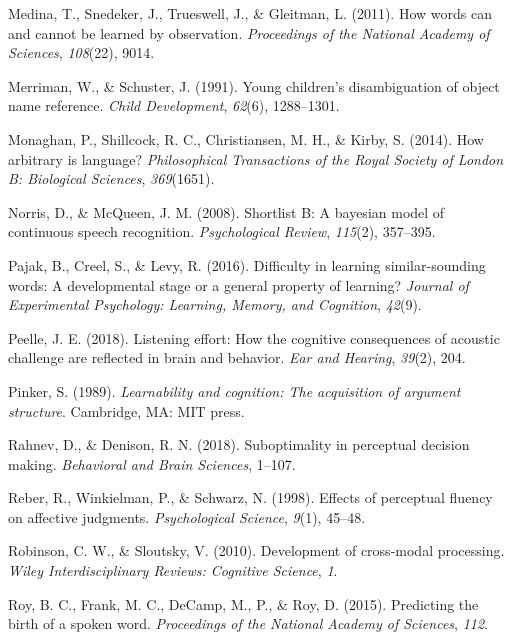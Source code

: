 \documentclass[english,floatsintext,man]{apa6}
\theoremstyle{definition}
\theoremstyle{definition}
\theoremstyle{definition}
\theoremstyle{remark}
\begin{document}
\hypertarget{ref-medina2011}{}
Medina, T., Snedeker, J., Trueswell, J., \& Gleitman, L. (2011). How
words can and cannot be learned by observation. \emph{Proceedings of the
National Academy of Sciences}, \emph{108}(22), 9014.

\hypertarget{ref-Merriman91}{}
Merriman, W., \& Schuster, J. (1991). Young children's disambiguation of
object name reference. \emph{Child Development}, \emph{62}(6),
1288--1301.

\hypertarget{ref-Monaghan2014}{}
Monaghan, P., Shillcock, R. C., Christiansen, M. H., \& Kirby, S.
(2014). How arbitrary is language? \emph{Philosophical Transactions of
the Royal Society of London B: Biological Sciences}, \emph{369}(1651).

\hypertarget{ref-Norris08}{}
Norris, D., \& McQueen, J. M. (2008). Shortlist B: A bayesian model of
continuous speech recognition. \emph{Psychological Review},
\emph{115}(2), 357--395.

\hypertarget{ref-pajak2016}{}
Pajak, B., Creel, S., \& Levy, R. (2016). Difficulty in learning
similar-sounding words: A developmental stage or a general property of
learning? \emph{Journal of Experimental Psychology: Learning, Memory,
and Cognition}, \emph{42}(9).

\hypertarget{ref-peelle2018}{}
Peelle, J. E. (2018). Listening effort: How the cognitive consequences
of acoustic challenge are reflected in brain and behavior. \emph{Ear and
Hearing}, \emph{39}(2), 204.

\hypertarget{ref-pinker1989}{}
Pinker, S. (1989). \emph{Learnability and cognition: The acquisition of
argument structure}. Cambridge, MA: MIT press.

\hypertarget{ref-rahnev2018}{}
Rahnev, D., \& Denison, R. N. (2018). Suboptimality in perceptual
decision making. \emph{Behavioral and Brain Sciences}, 1--107.

\hypertarget{ref-reber98}{}
Reber, R., Winkielman, P., \& Schwarz, N. (1998). Effects of perceptual
fluency on affective judgments. \emph{Psychological Science},
\emph{9}(1), 45--48.

\hypertarget{ref-robinson2010}{}
Robinson, C. W., \& Sloutsky, V. (2010). Development of cross-modal
processing. \emph{Wiley Interdisciplinary Reviews: Cognitive Science},
\emph{1}.

\hypertarget{ref-roy2015}{}
Roy, B. C., Frank, M. C., DeCamp, M., P., \& Roy, D. (2015). Predicting
the birth of a spoken word. \emph{Proceedings of the National Academy of
Sciences}, \emph{112}.
\end{document}
